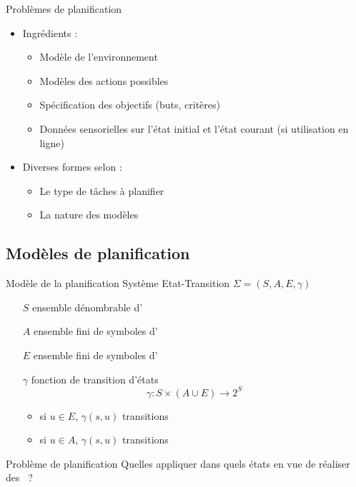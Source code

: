 \documentclass[compress]{beamer}
\begin{document}
\begin{frame}{Problèmes de planification}
\begin{itemize}
\item Ingrédients :
	\begin{itemize}
	\item Modèle de l'environnement
	\item Modèles des actions possibles
	\item Spécification des objectifs (buts, critères)
	\item Données sensorielles sur l'état initial et l'état courant (si utilisation en ligne)
	\end{itemize}
\item Diverses formes selon :
	\begin{itemize}
	\item Le type de tâches à planifier
	\item La nature des modèles
	\end{itemize}
\end{itemize}
\end{frame}

\subsection{Modèles de planification}
\begin{frame}{Modèle de la planification}
Système Etat-Transition $\Sigma = (S, A, E, \gamma)$
\begin{itemize}
\item[$S$] ensemble dénombrable d'
\item[$A$] ensemble fini de symboles d'
\item[$E$] ensemble fini de symboles d'
\item[$\gamma$] fonction de transition d'états
	$$\gamma: S \times (A \cup E) \rightarrow 2^S$$
	\begin{itemize}
	\item si $u \in E$, $\gamma(s, u)$ transitions 
	\item si $u \in A$, $\gamma(s, u)$ transitions 
	\end{itemize}
\end{itemize}
\begin{block}{Problème de planification}
Quelles  appliquer dans quels états en vue de réaliser des ~?
\end{block}
\end{frame}
\end{document}
